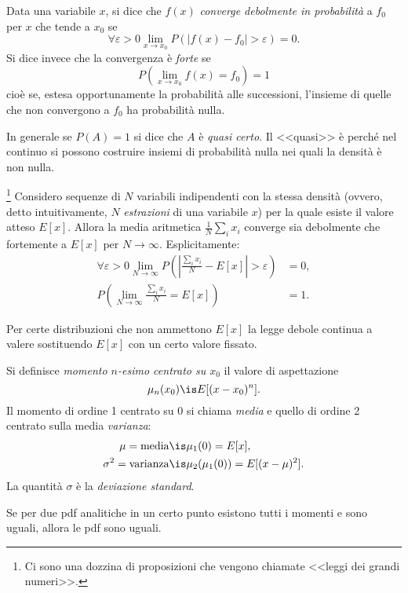 \begin{defn}
	Data una variabile $x$, si dice che $f(x)$ \emph{converge debolmente in probabilità} a $f_0$ per $x$ che tende a $x_0$ se
	\begin{equation*}
		\forall\varepsilon > 0 \lim_{x\to x_0} P\left( \left| f(x) - f_0 \right| > \varepsilon \right) = 0.
	\end{equation*}
	Si dice invece che la convergenza è \emph{forte} se
	\begin{equation*}
		P\left( \lim_{x\to x_0} f(x) = f_0 \right) = 1
	\end{equation*}
	cioè se, estesa opportunamente la probabilità alle successioni, l'insieme di quelle che non convergono a $f_0$ ha probabilità nulla.
\end{defn}

In generale se $P(A)=1$ si dice che $A$ è \emph{quasi certo}. Il <<quasi>> è perché nel continuo si possono costruire insiemi di probabilità nulla nei quali la densità è non nulla.

\begin{fat}
	\footnote{Ci sono una dozzina di proposizioni che vengono chiamate <<leggi dei grandi numeri>>.}
	Considero sequenze di $N$ variabili indipendenti con la stessa densità (ovvero, detto intuitivamente, $N$ \emph{estrazioni} di una variabile $x$) per la quale esiste il valore atteso $E[x]$.
	Allora la media aritmetica $\frac1N\sum_ix_i$ converge sia debolmente che fortemente a $E[x]$ per $N\to\infty$.
	Esplicitamente:
	\begin{align*}
		\forall\varepsilon > 0 \lim_{N\to \infty} P\left( \left| \frac{\sum_ix_i}N - E[x] \right| > \varepsilon \right) &= 0, \\
		P\left( \lim_{N\to \infty} \frac{\sum_ix_i}N = E[x] \right) &= 1.
	\end{align*}
\end{fat}

Per certe distribuzioni che non ammettono $E[x]$ la legge debole continua a valere sostituendo $E[x]$ con un certo valore fissato.

\begin{defn}[Momenti]
	Si definisce \emph{momento $n$-esimo centrato su $x_0$} il valore di aspettazione
	\begin{equation*}
		\mu_n(x_0) \is E[(x - x_0)^n].
	\end{equation*}
	Il momento di ordine 1 centrato su 0 si chiama \emph{media} e quello di ordine 2 centrato sulla media \emph{varianza}:
	\begin{align*}
		\mu = \text{media} &\is \mu_1(0) = E[x], \\
		\sigma^2 = \text{varianza} &\is \mu_2(\mu_1(0)) = E[(x-\mu)^2].
	\end{align*}
	La quantità $\sigma$ è la \emph{deviazione standard}.
\end{defn}

\begin{fat}
	Se per due pdf analitiche in un certo punto esistono tutti i momenti e sono uguali, allora le pdf sono uguali.
\end{fat}
